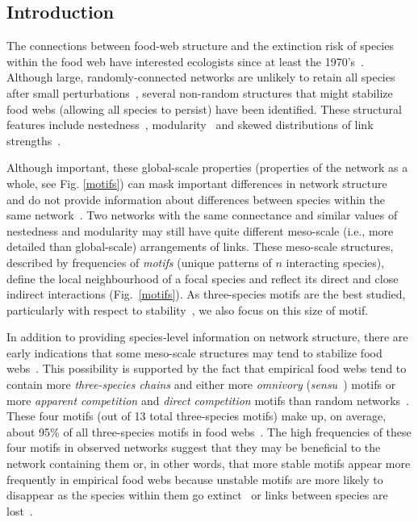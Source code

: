 \documentclass[12pt]{article}
\begin{document}
\begin{spacing}{2.0}
\clearpage
    
\section*{Introduction}

	The connections between food-web structure and the extinction risk of species within the food web have interested ecologists since at least the 1970's~\citep{May1972}. Although large, randomly-connected networks are unlikely to retain all species after small perturbations~\citep{Gardner1970,May1972}, several non-random structures that might stabilize food webs (allowing all species to persist) have been identified. These structural features include nestedness~\citep{Allesina2012,Sauve2014}, modularity~\citep{Sauve2014,Thebault2010} and skewed distributions of link strengths~\citep{McCann1998,Gross2009,Rooney2012,Wootton2016}.
	
	
	Although important, these global-scale properties (properties of the network as a whole, see Fig. \ref{motifs}) can mask important differences in network structure~\citep{Simmons2019} and do not provide information about differences between species within the same network~\citep{Cirtwill2018FoodWebs}. 
	Two networks with the same connectance and similar values of nestedness and modularity may still have quite different meso-scale (i.e., more detailed than global-scale) arrangements of links. 
	These meso-scale structures, described by frequencies of \emph{motifs} (unique patterns of $n$ interacting species), define the local neighbourhood of a focal species and reflect its direct and close indirect interactions (Fig.~\ref{motifs}).
    As three-species motifs are the best studied, particularly with respect to stability~\citep{Stouffer2007,Borrelli2015,Borrelli2015a,Giling2019b}, we also focus on this size of motif.
	
	
    In addition to providing species-level information on network structure, there are early indications that some meso-scale structures may tend to stabilize food webs~\citep{Prill2005,Borrelli2015,Monteiro2016}. 
    This possibility is supported by the fact that empirical food webs tend to contain more \emph{three-species chains} and either more \emph{omnivory} (\emph{sensu}~\citealp[]{Thompson2007b}) motifs or more \emph{apparent competition} and \emph{direct competition} motifs than random networks~\citep{Stouffer2007}. 
    These four motifs (out of 13 total three-species motifs) make up, on average, about 95\% of all three-species motifs in food webs~\citep{Stouffer2010b}. 
    The high frequencies of these four motifs in observed networks suggest that they may be beneficial to the network containing them or, in other words, that more stable motifs appear more frequently in empirical food webs because unstable motifs are more likely to disappear as the species within them go extinct~\citep{Borrelli2015,Borrelli2015a} or links between species are lost~\citep{Tylianakis2010}.


\end{spacing}
\end{document}
